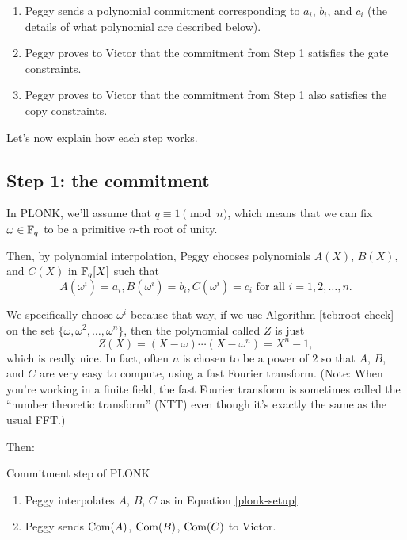 \begin{enumerate}
\item
  Peggy sends a polynomial commitment corresponding to $a_{i}$,
  $b_{i}$, and $c_{i}$ (the details of what polynomial are described
  below).
\item
  Peggy proves to Victor that the commitment from Step 1 satisfies the
  gate constraints.
\item
  Peggy proves to Victor that the commitment from Step 1 also satisfies
  the copy constraints.
\end{enumerate}

Let's now explain how each step works.

\subsection{Step 1: the commitment}

In PLONK, we'll assume that $q \equiv 1 \pmod n$, which
means that we can fix $\omega \in \mathbb{F}_{q}$ to be a primitive
$n$-th root of unity.

Then, by polynomial interpolation, Peggy chooses polynomials $A(X)$,
$B(X)$, and $C(X)$ in $\mathbb{F}_{q}[X]$ such that
\begin{equation}
\label{plonk-setup}
A( \omega^{i} ) = a_{i},B( \omega^{i} ) = b_{i},C( \omega^{i} ) = c_{i}\text{  for all  }i = 1,2,\ldots,n.
\end{equation}

We specifically choose $\omega^{i}$ because that way, if we use
Algorithm \ref{tcb:root-check} on the set
$ \{ \omega,\omega^{2},\ldots,\omega^{n} \} $, then the
polynomial called $Z$ is just
\[Z(X) = (X - \omega)\cdots( X - \omega^{n} ) = X^{n} - 1,\]
which is really nice. In fact, often $n$ is chosen to be a power of
$2$ so that $A$, $B$, and $C$ are very easy to compute, using a
fast Fourier transform. (Note: When you're working in a finite field,
the fast Fourier transform is sometimes called the ``number theoretic
transform'' (NTT) even though it's exactly the same as the usual FFT.)

Then:

\begin{algo}{Commitment step of PLONK}{}
\begin{enumerate}
\item
  Peggy interpolates $A$, $B$, $C$ as in
  Equation \eqref{plonk-setup}.
\item
  Peggy sends $\operatorname{Com}(A)$, $\operatorname{Com}(B)$,
  $\operatorname{Com}(C)$ to Victor.
\end{enumerate}
\end{algo}

